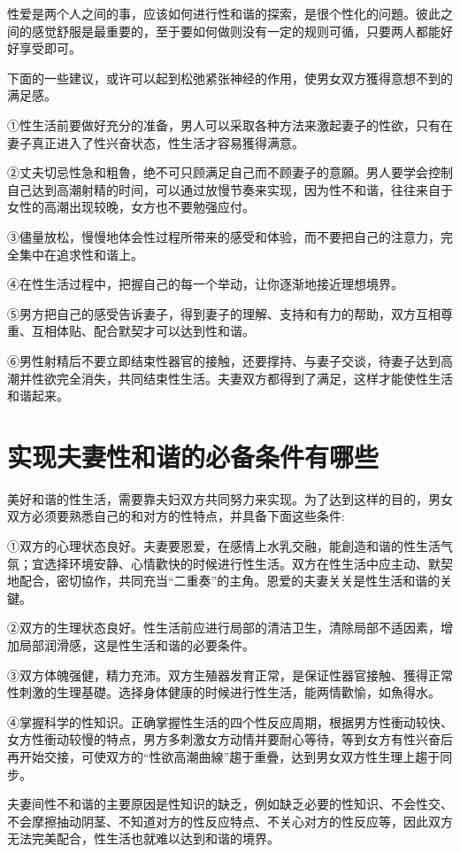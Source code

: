 \documentclass[12pt,UTF8]{ctexbook}
\begin{document}
性爱是两个人之间的事，应该如何进行性和谐的探索，是很个性化的问題。彼此之间的感觉舒服是最重要的，至于要如何做则没有一定的规则可循，只要两人都能好好享受即可。

下面的一些建议，或许可以起到松弛紧张神经的作用，使男女双方獲得意想不到的满足感。

①性生活前要做好充分的准备，男人可以采取各种方法来激起妻子的性欲，只有在妻子真正进入了性兴奋状态，性生活才容易獲得满意。

②丈夫切忌性急和粗魯，绝不可只顾满足自己而不顾妻子的意願。男人要学会控制自己达到高潮射精的时间，可以通过放慢节奏来实现，因为性不和谐，往往来自于女性的高潮出现较晚，女方也不要勉强应付。

③儘量放松，慢慢地体会性过程所带来的感受和体验，而不要把自己的注意力，完全集中在追求性和谐上。

④在性生活过程中，把握自己的每一个举动，让你逐渐地接近理想境界。

⑤男方把自己的感受告诉妻子，得到妻子的理解、支持和有力的帮助，双方互相尊重、互相体贴、配合默契才可以达到性和谐。

⑥男性射精后不要立即结束性器官的接触，还要撑持、与妻子交谈，待妻子达到高潮并性欲完全消失，共同结束性生活。夫妻双方都得到了满足，这样才能使性生活和谐起来。

\section{实现夫妻性和谐的必备条件有哪些}

美好和谐的性生活，需要靠夫妇双方共同努力来实现。为了达到这样的目的，男女双方必须要熟悉自己的和对方的性特点，并具备下面这些条件:

①双方的心理状态良好。夫妻要恩爱，在感情上水乳交融，能創造和谐的性生活气氛；宜选择环境安静、心情歡快的时候进行性生活。双方在性生活中应主动、默契地配合，密切協作，共同充当“二重奏”的主角。恩爱的夫妻关关是性生活和谐的关鍵。

②双方的生理状态良好。性生活前应进行局部的清洁卫生，清除局部不适因素，增加局部润滑感，这是性生活和谐的必要条件。

③双方体魄强健，精力充沛。双方生殖器发育正常，是保证性器官接触、獲得正常性刺激的生理基礎。选择身体健康的时候进行性生活，能两情歡愉，如魚得水。

④掌握科学的性知识。正确掌握性生活的四个性反应周期，根据男方性衝动较快、女方性衝动较慢的特点，男方多刺激女方动情并要耐心等待，等到女方有性兴奋后再开始交接，可使双方的“性欲高潮曲線”趨于重疊，达到男女双方性生理上趨于同步。

夫妻间性不和谐的主要原因是性知识的缺乏，例如缺乏必要的性知识、不会性交、不会摩擦抽动阴茎、不知道对方的性反应特点、不关心对方的性反应等，因此双方无法完美配合，性生活也就难以达到和谐的境界。
\end{document}
